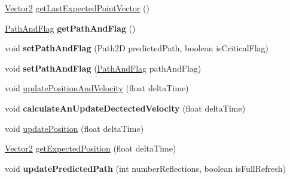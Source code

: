 \begin{DoxyCompactItemize}
\item 
\hyperlink{classairhockeyjava_1_1util_1_1_vector2}{Vector2} \hyperlink{classairhockeyjava_1_1physical_1_1_moving_item_a70f2dbc3d9a87a1ba7c2203f54e8d4c5}{get\+Last\+Expected\+Point\+Vector} ()
\item 
\hypertarget{classairhockeyjava_1_1physical_1_1_moving_item_acaa7bfa56c04bae76f082aa6731bce9a}{}\hyperlink{classairhockeyjava_1_1physical_1_1_moving_item_1_1_path_and_flag}{Path\+And\+Flag} {\bfseries get\+Path\+And\+Flag} ()\label{classairhockeyjava_1_1physical_1_1_moving_item_acaa7bfa56c04bae76f082aa6731bce9a}

\item 
\hypertarget{classairhockeyjava_1_1physical_1_1_moving_item_a559bdd679d2b90a58664f7ba2c360833}{}void {\bfseries set\+Path\+And\+Flag} (Path2\+D predicted\+Path, boolean is\+Critical\+Flag)\label{classairhockeyjava_1_1physical_1_1_moving_item_a559bdd679d2b90a58664f7ba2c360833}

\item 
\hypertarget{classairhockeyjava_1_1physical_1_1_moving_item_ad63bc568b33d6912bf3dd1ad5e53fc1c}{}void {\bfseries set\+Path\+And\+Flag} (\hyperlink{classairhockeyjava_1_1physical_1_1_moving_item_1_1_path_and_flag}{Path\+And\+Flag} path\+And\+Flag)\label{classairhockeyjava_1_1physical_1_1_moving_item_ad63bc568b33d6912bf3dd1ad5e53fc1c}

\item 
void \hyperlink{classairhockeyjava_1_1physical_1_1_moving_item_a0f6fb09720a8bbd2b26170527affd67f}{update\+Position\+And\+Velocity} (float delta\+Time)
\item 
\hypertarget{classairhockeyjava_1_1physical_1_1_moving_item_a65b1e6037ad33c5c18dada83c739cfd6}{}void {\bfseries calculate\+An\+Update\+Dectected\+Velocity} (float delta\+Time)\label{classairhockeyjava_1_1physical_1_1_moving_item_a65b1e6037ad33c5c18dada83c739cfd6}

\item 
void \hyperlink{classairhockeyjava_1_1physical_1_1_moving_item_ac890e964d8d7fbc3882a849c773310d8}{update\+Position} (float delta\+Time)
\item 
\hyperlink{classairhockeyjava_1_1util_1_1_vector2}{Vector2} \hyperlink{classairhockeyjava_1_1physical_1_1_moving_item_a01d99f299a51da8da28e924ff0b8b557}{get\+Expected\+Position} (float delta\+Time)
\item 
\hypertarget{classairhockeyjava_1_1physical_1_1_moving_item_a6a4ec1c93185988c1c2122e7e12a2be2}{}void {\bfseries update\+Predicted\+Path} (int number\+Reflections, boolean is\+Full\+Refresh)\label{classairhockeyjava_1_1physical_1_1_moving_item_a6a4ec1c93185988c1c2122e7e12a2be2}


\end{DoxyCompactItemize}
